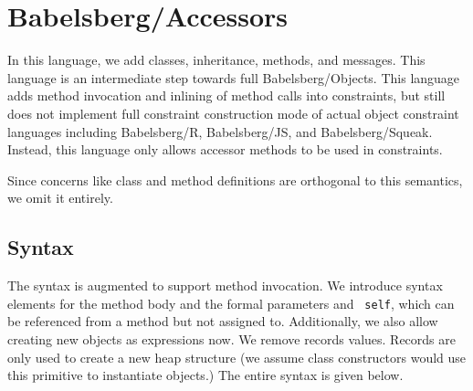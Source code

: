 \documentclass{article}
\begin{document}
\section{Babelsberg/Accessors}
\label{sec:babelsbergobjects}

In this language, we add classes, inheritance, methods, and messages.
This language is an intermediate step towards full
Babelsberg/Objects. This language adds method invocation and inlining
of method calls into constraints, but still does not implement full
constraint construction mode of actual object constraint languages
including Babelsberg/R, Babelsberg/JS, and Babelsberg/Squeak. Instead,
this language only allows accessor methods to be used in constraints.

Since concerns like class and method definitions are orthogonal to
this semantics, we omit it entirely.


\subsection{Syntax}

The syntax is augmented to support method invocation. We introduce
syntax elements for the method body and the formal parameters and {\tt
  self}, which can be referenced from a method but not assigned
to. Additionally, we also allow creating new objects as expressions
now. We remove records values. Records are only used to create a new
heap structure (we assume class constructors would use this primitive
to instantiate objects.) The entire syntax is given below.
\end{document}
